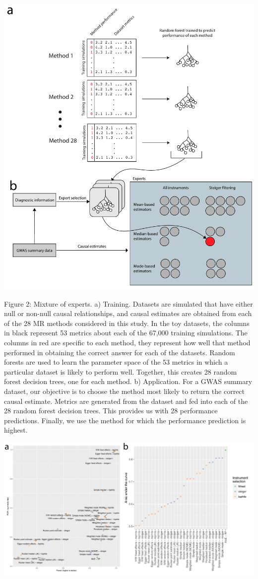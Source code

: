 \documentclass[]{article}
\begin{document}
\includegraphics{images/fig2.pdf}

Figure 2: Mixture of experts. a) Training. Datasets are simulated that
have either null or non-null causal relationships, and causal estimates
are obtained from each of the 28 MR methods considered in this study. In
the toy datasets, the columns in black represent 53 metrics about each
of the 67,000 training simulations. The columns in red are specific to
each method, they represent how well that method performed in obtaining
the correct answer for each of the datasets. Random forests are used to
learn the parameter space of the 53 metrics in which a particular
dataset is likely to perform well. Together, this creates 28 random
forest decision trees, one for each method. b) Application. For a GWAS
summary dataset, our objective is to choose the method most likely to
return the correct causal estimate. Metrics are generated from the
dataset and fed into each of the 28 random forest decision trees. This
provides us with 28 performance predictions. Finally, we use the method
for which the performance prediction is highest.

\newpage

\includegraphics{images/fig3.pdf}
\end{document}
